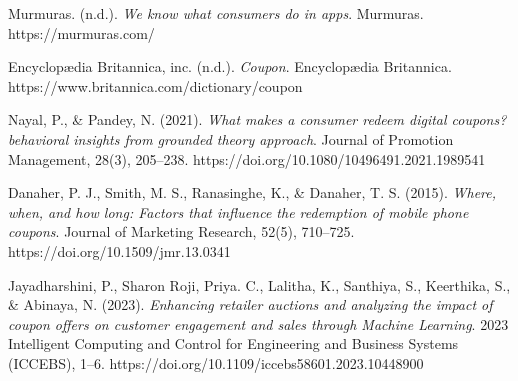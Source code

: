 \documentclass[licencjacka,en]{pracamgr}
\begin{document}
\begin{thebibliography}{99}

\raggedright

Murmuras. (n.d.).  \textit{We know what consumers do in apps}. Murmuras. https://murmuras.com/


Encyclopædia Britannica, inc. (n.d.). \textit{Coupon}. Encyclopædia Britannica. https://www.britannica.com/dictionary/coupon

Nayal, P., \& Pandey, N. (2021). \textit{What makes a consumer redeem digital coupons? behavioral insights from grounded theory approach}. Journal of Promotion Management, 28(3), 205–238. https://doi.org/10.1080/10496491.2021.1989541

Danaher, P. J., Smith, M. S., Ranasinghe, K., \& Danaher, T. S. (2015). \textit{Where, when, and how long: Factors that influence the redemption of mobile phone coupons}. Journal of Marketing Research, 52(5), 710–725. https://doi.org/10.1509/jmr.13.0341

Jayadharshini, P., Sharon Roji, Priya. C., Lalitha, K., Santhiya, S., Keerthika, S., \& Abinaya, N. (2023). \textit{Enhancing retailer auctions and analyzing the impact of coupon offers on customer engagement and sales through Machine Learning}. 2023 Intelligent Computing and Control for Engineering and Business Systems (ICCEBS), 1–6. https://doi.org/10.1109/iccebs58601.2023.10448900


\end{thebibliography}
\end{document}

